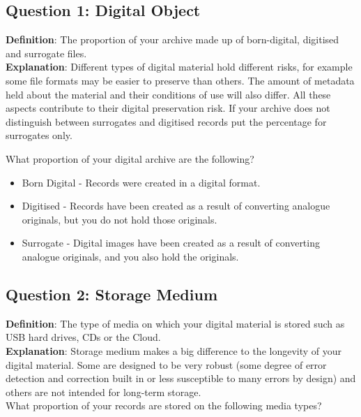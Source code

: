 \documentclass[a4paper,oneside]{article}
\let\oldmaketitle\maketitle
\renewcommand{\maketitle}{\oldmaketitle\thispagestyle{empty}\clearpage}
\providecommand{\tightlist}{%
    \setlength{\itemsep}{2pt}\setlength{\parskip}{0pt}}
\begin{document}
\begin{landscape}


\begin{titlepage}
\maketitle
\end{titlepage}

\pagecolor{nataCoolGrey}

\hypertarget{question-1-digital-object}{%
\subsection{Question 1: Digital Object}\label{question-1-digital-object}}

\textbf{Definition}: The proportion of your archive made up of born-digital, digitised and surrogate files.\\
\textbf{Explanation}: Different types of digital material hold different risks, for example some file formats may be easier to preserve than others. The amount of metadata held about the material and their conditions of use will also differ. All these aspects contribute to their digital preservation risk.
If your archive does not distinguish between surrogates and digitised records put the percentage for surrogates only.

What proportion of your digital archive are the following?

\begin{itemize}
\tightlist
\item
  Born Digital - Records were created in a digital format.\\
\item
  Digitised - Records have been created as a result of converting analogue originals, but you do not hold those originals.\\
\item
  Surrogate - Digital images have been created as a result of converting analogue originals, and you also hold the originals.
\end{itemize}

\newpage

\hypertarget{question-2-storage-medium}{%
\subsection{Question 2: Storage Medium}\label{question-2-storage-medium}}

\textbf{Definition}: The type of media on which your digital material is stored such as USB hard drives, CDs or the Cloud.\\
\textbf{Explanation}: Storage medium makes a big difference to the longevity of your digital material. Some are designed to be very robust (some degree of error detection and correction built in or less susceptible to many errors by design) and others are not intended for long-term storage.\\
What proportion of your records are stored on the following media types?


\end{landscape}
\end{document}
